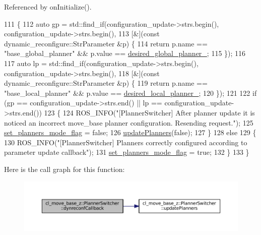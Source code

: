 Referenced by on\+Initialize().


\begin{DoxyCode}
111 \{
112   \textcolor{keyword}{auto} gp = std::find\_if(configuration\_update->strs.begin(), configuration\_update->strs.begin(),
113                          [&](\textcolor{keyword}{const} dynamic\_reconfigure::StrParameter &p) \{
114                            \textcolor{keywordflow}{return} p.name == \textcolor{stringliteral}{"base\_global\_planner"} && p.value == 
      \hyperlink{classcl__move__base__z_1_1PlannerSwitcher_aef047d3778b2993c1df146bbad43e03d}{desired\_global\_planner\_};
115                          \});
116 
117   \textcolor{keyword}{auto} lp = std::find\_if(configuration\_update->strs.begin(), configuration\_update->strs.begin(),
118                          [&](\textcolor{keyword}{const} dynamic\_reconfigure::StrParameter &p) \{
119                            \textcolor{keywordflow}{return} p.name == \textcolor{stringliteral}{"base\_local\_planner"} && p.value == 
      \hyperlink{classcl__move__base__z_1_1PlannerSwitcher_a6cbf65f11bb69125f913caaabdf7b4cf}{desired\_local\_planner\_};
120                          \});
121 
122   \textcolor{keywordflow}{if} (gp == configuration\_update->strs.end() || lp == configuration\_update->strs.end())
123   \{
124     ROS\_INFO(\textcolor{stringliteral}{"[PlannerSwitcher] After planner update it is noticed an incorrect move\_base planner
       configuration. Resending request."});
125     \hyperlink{classcl__move__base__z_1_1PlannerSwitcher_a6c14fd001513787ed213704e2d3dc383}{set\_planners\_mode\_flag} = \textcolor{keyword}{false};
126     \hyperlink{classcl__move__base__z_1_1PlannerSwitcher_a146641f63aea3185daab4c5cbb789550}{updatePlanners}(\textcolor{keyword}{false});
127   \}
128   \textcolor{keywordflow}{else}
129   \{
130     ROS\_INFO(\textcolor{stringliteral}{"[PlannerSwitcher] Planners correctly configured according to parameter update callback"});
131     \hyperlink{classcl__move__base__z_1_1PlannerSwitcher_a6c14fd001513787ed213704e2d3dc383}{set\_planners\_mode\_flag} = \textcolor{keyword}{true};
132   \}
133 \}
\end{DoxyCode}
Here is the call graph for this function\+:
\nopagebreak
\begin{figure}[H]
\begin{center}
\leavevmode
\includegraphics[width=350pt]{classcl__move__base__z_1_1PlannerSwitcher_ad9371bd8d62600ef874e8914c3ec177b_cgraph}
\end{center}
\end{figure}
